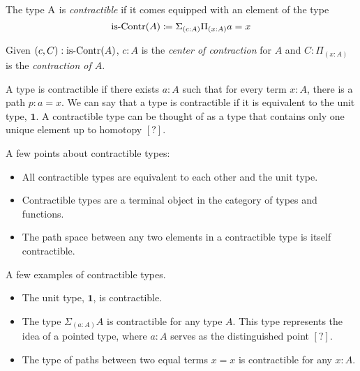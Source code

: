 \documentclass{article}
\begin{document}
\begin{definition}
  The type $\operatorname{A}$ is \emph{contractible} if it comes equipped with an element of the type
  \begin{equation*}
    \is-Contr(A) \coloneq \Sigma_{(c : A)}\Pi_{(x : A)} a = x
  \end{equation*}

  Given $(c, C) : \is-Contr(A)$, $c : A$ is the \emph{center of contraction} for $A$ and $C : \Pi_{(x : A)}$ is the \emph{contraction of $A$}.
\end{definition}
\begin{remark}[Intuition]
  A type is contractible if there exists $a : A$ such that for every term $x : A$, there is a path $p : a = x$. We can say that a type is contractible if it is equivalent to the unit type, $\mathbf{1}$. A contractible type can be thought of as a type that contains only one unique element up to homotopy $\mathbf{[?]}$.
\end{remark}

\begin{remark}[Properties]
  A few points about contractible types:
  \begin{itemize}
    \item All contractible types are equivalent to each other and the unit type.

    \item Contractible types are a terminal object in the category of types and functions.

    \item The path space between any two elements in a contractible type is itself contractible.
  \end{itemize}
\end{remark}
\begin{remark}[Examples]
   A few examples of contractible types.
  \begin{itemize}
    \item The unit type, $\mathbf{1}$, is contractible.

    \item The type $\Sigma_{(a : A)} A$ is contractible for any type $A$. This type represents the idea of a pointed type, where $a : A$ serves as the distinguished point $\mathbf{[?]}$.

    \item The type of paths between two equal terms $x = x$ is contractible for any $x : A$.

  \end{itemize}
\end{remark}
\end{document}
